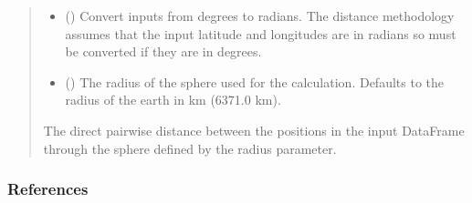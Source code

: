 \documentclass[letterpaper,10pt,english]{sphinxmanual}
\begin{document}
\begin{fulllineitems}
\begin{quote}
\begin{description}
\begin{itemize}
\item {}
\sphinxAtStartPar
{} () \textendash{} Convert inputs from degrees to radians. The distance methodology assumes
that the input latitude and longitudes are in radians so must be
converted if they are in degrees.

\item {}
\sphinxAtStartPar
{} () \textendash{} The radius of the sphere used for the calculation. Defaults to the
radius of the earth in km (6371.0 km).

\end{itemize}

\sphinxAtStartPar
{} \textendash{} The direct pairwise distance between the positions in the input
DataFrame through the sphere defined by the radius parameter.

\sphinxAtStartPar
{}

\end{description}\end{quote}
\subsubsection*{References}

\sphinxAtStartPar
{}

\end{fulllineitems}

\end{document}
